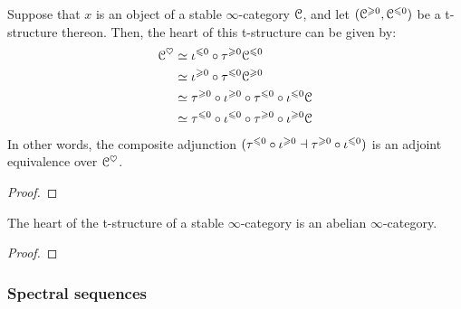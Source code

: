             \begin{corollary} \label{coro: short_exact_sequences_and_truncations}
                Suppose that $x$ is an object of a stable $\infty$-category $\mathcal{C}$, and let $(\mathcal{C}^{\geqslant 0}, \mathcal{C}^{\leqslant 0})$ be a t-structure thereon. Then, the heart of this t-structure can be given by:
                    $$
                        \begin{aligned}
                            \mathcal{C}^{\heartsuit} & \simeq \iota^{\leqslant 0} \circ \tau^{\geqslant 0} \mathcal{C}^{\leqslant 0}
                            \\
                            & \simeq \iota^{\geqslant 0} \circ \tau^{\leqslant 0} \mathcal{C}^{\geqslant 0} 
                            \\
                            & \simeq \tau^{\geqslant 0} \circ \iota^{\geqslant 0} \circ \tau^{\leqslant 0} \circ \iota^{\leqslant 0} \mathcal{C} 
                            \\
                            & \simeq \tau^{\leqslant 0} \circ \iota^{\leqslant 0} \circ \tau^{\geqslant 0} \circ \iota^{\geqslant 0} \mathcal{C}
                        \end{aligned}
                    $$
                In other words, the composite adjunction $(\tau^{\leqslant 0} \circ \iota^{\geqslant 0} \dashv \tau^{\geqslant 0} \circ \iota^{\leqslant 0})$ is an adjoint equivalence over $\mathcal{C}^{\heartsuit}$. 
            \end{corollary}
                \begin{proof}
                    
                \end{proof}
            
            \begin{theorem} \label{theorem: hearts_are_abelian} 
                The heart of the t-structure of a stable $\infty$-category is an abelian $\infty$-category.
            \end{theorem}
                \begin{proof}
                    
                \end{proof}
                
        \subsubsection{Spectral sequences}
        
